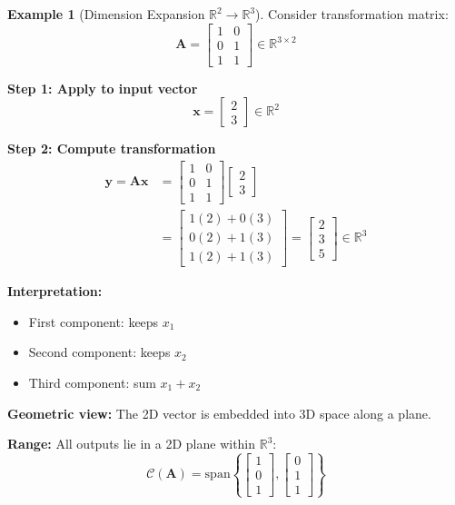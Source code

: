 \documentclass[12pt,a4paper]{article}
\theoremstyle{definition}
\newtheorem{example}{Example}[section]
\begin{document}
\begin{example}[Dimension Expansion $\mathbb{R}^2 \to \mathbb{R}^3$]
Consider transformation matrix:
\begin{equation}
\mathbf{A} = \begin{bmatrix}
1 & 0 \\
0 & 1 \\
1 & 1
\end{bmatrix} \in \mathbb{R}^{3 \times 2}
\end{equation}

\textbf{Step 1: Apply to input vector}
\begin{equation}
\mathbf{x} = \begin{bmatrix} 2 \\ 3 \end{bmatrix} \in \mathbb{R}^2
\end{equation}

\textbf{Step 2: Compute transformation}
\begin{align}
\mathbf{y} = \mathbf{A}\mathbf{x} &= \begin{bmatrix}
1 & 0 \\
0 & 1 \\
1 & 1
\end{bmatrix} \begin{bmatrix} 2 \\ 3 \end{bmatrix} \\
&= \begin{bmatrix}
1(2) + 0(3) \\
0(2) + 1(3) \\
1(2) + 1(3)
\end{bmatrix} = \begin{bmatrix} 2 \\ 3 \\ 5 \end{bmatrix} \in \mathbb{R}^3
\end{align}

\textbf{Interpretation:}
\begin{itemize}
    \item First component: keeps $x_1$
    \item Second component: keeps $x_2$
    \item Third component: sum $x_1 + x_2$
\end{itemize}

\textbf{Geometric view:} The 2D vector is embedded into 3D space along a plane.

\textbf{Range:} All outputs lie in a 2D plane within $\mathbb{R}^3$:
\begin{equation}
\mathcal{C}(\mathbf{A}) = \text{span}\left\{\begin{bmatrix} 1 \\ 0 \\ 1 \end{bmatrix}, \begin{bmatrix} 0 \\ 1 \\ 1 \end{bmatrix}\right\}
\end{equation}
\end{example}
\end{document}
